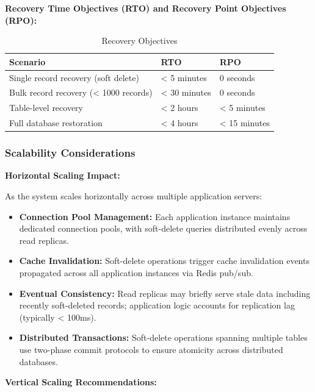 \documentclass[12pt,a4paper]{article}
\begin{document}
\begin{tcolorbox}[colback=primaryblue!5, colframe=primaryblue, boxrule=1pt, arc=3pt, left=10pt, right=10pt, top=8pt, bottom=8pt]
\textbf{Recovery Time Objectives (RTO) and Recovery Point Objectives (RPO):}

\begin{table}[H]
\centering
\begin{tabular}{|p{5cm}|p{3cm}|p{3cm}|}
\hline
\textbf{Scenario} & \textbf{RTO} & \textbf{RPO} \\
\hline
Single record recovery (soft delete) & < 5 minutes & 0 seconds \\
\hline
Bulk record recovery (< 1000 records) & < 30 minutes & 0 seconds \\
\hline
Table-level recovery & < 2 hours & < 5 minutes \\
\hline
Full database restoration & < 4 hours & < 15 minutes \\
\hline
\end{tabular}
\caption{Recovery Objectives}
\end{table}

\subsubsection{Scalability Considerations}

\textbf{Horizontal Scaling Impact:}

As the system scales horizontally across multiple application servers:

\begin{itemize}[leftmargin=2em, itemsep=6pt]
    \item \textbf{Connection Pool Management:} Each application instance maintains dedicated connection pools, with soft-delete queries distributed evenly across read replicas.
    \item \textbf{Cache Invalidation:} Soft-delete operations trigger cache invalidation events propagated across all application instances via Redis pub/sub.
    \item \textbf{Eventual Consistency:} Read replicas may briefly serve stale data including recently soft-deleted records; application logic accounts for replication lag (typically < 100ms).
    \item \textbf{Distributed Transactions:} Soft-delete operations spanning multiple tables use two-phase commit protocols to ensure atomicity across distributed databases.
\end{itemize}

\vspace{0.5em}

\textbf{Vertical Scaling Recommendations:}


\end{tcolorbox}
\end{document}
